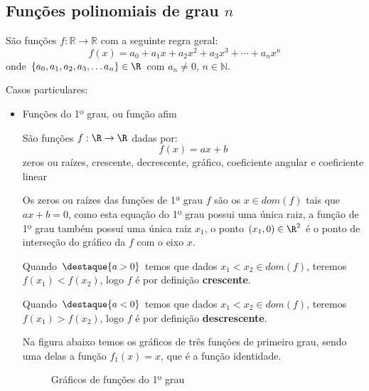 \subsection{Funções polinomiais de grau \texorpdfstring{$n$}{n}}

 São funções $f: \mathbb{R} \rightarrow \mathbb{R}$ com a seguinte regra geral:
 \[f(x) = a_0 + a_1 x + a_2 x^2 + a_3 x^3 + \cdots + a_n x^n\]
 onde $\{a_0, a_1, a_2, a_3, \ldots a_n\} \in \R$ com $a_n \neq 0$, $n \in \mathbb{N}$.

 Casos particulares:
 \begin{itemize}
 \item Funções do 1º grau, ou função afim

 São funções $f: \R \rightarrow \R$ dadas por:
 \[f(x)= ax + b\]
 {\color{red} zeros ou raízes, crescente, decrescente, gráfico, coeficiente angular e coeficiente linear}

 Os zeros ou raízes das funções de 1ª grau $f$ são os $x \in dom(f)$ tais que $ax+b=0$, como esta equação do 1º grau possui uma única raiz, a função de 1º grau também possui uma única raiz $x_1$, o ponto $(x_1, 0) \in \R^2$ é o ponto de interseção do gráfico da $f$ com o eixo $x$.

 Quando $\destaque{a > 0}$ temos que dados $x_1 < x_2 \in dom(f)$, teremos $f(x_1) < f(x_2)$, logo $f$ é por definição \textbf{crescente}.

 Quando $\destaque{a < 0}$ temos que dados $x_1 < x_2 \in dom(f)$, teremos $f(x_1) > f(x_2)$, logo $f$ é por definição \textbf{descrescente}.

 Na figura abaixo temos os gráficos de três funções de primeiro grau, sendo uma delas a função $f_1(x)= x$, que é a função identidade.
 \begin{figure}[H]
 \centering
    \caption{Gráficos de funções do 1º grau}
  \end{figure}




\end{itemize}
